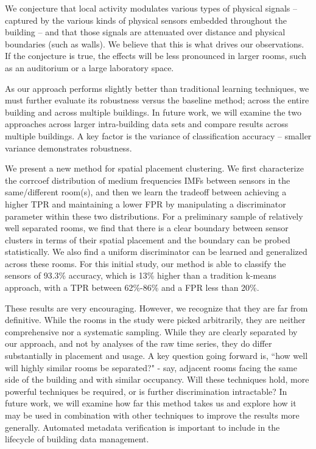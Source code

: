 We conjecture that local activity modulates various types of physical 
signals -- captured by the various kinds of physical sensors embedded
throughout the building -- and that those signals are attenuated
over distance and physical boundaries (such as walls).  We believe that this is what drives our observations. 
If the conjecture is true, the effects will be less pronounced in larger rooms, such as an auditorium or a large laboratory space.


As our approach performs slightly better than traditional learning techniques, we must further evaluate its robustness
versus the baseline method; across the entire building and across multiple buildings.  In future work, we will examine the 
two approaches across larger intra-building data sets and compare results across multiple buildings.
A key factor is the variance of classification accuracy -- smaller variance demonstrates robustness.  

We present a new method for spatial placement clustering.  
We first characterize the corrcoef distribution of medium frequencies IMFs between sensors in the same/different room(s), and then we learn the tradeoff between achieving a higher TPR and maintaining a lower FPR by manipulating a discriminator parameter within these two distributions. 
For a preliminary sample of relatively well separated rooms, we find that there is a clear boundary between sensor clusters in terms of their spatial placement and the boundary can be probed statistically.  We also find 
a uniform discriminator can be learned and generalized across these rooms.  
For this initial study, our method is able to classify the sensors of 93.3\% accuracy, which is 13\% higher than a tradition k-means approach, with a TPR between 62\%-86\% and a FPR less than 20\%. 

These results are very encouraging. However, we recognize that they are far from definitive. While the rooms in the study were picked arbitrarily, they are neither comprehensive nor a systematic sampling.  While they are clearly separated by our approach, and not by analyses of the raw time series, they do differ substantially in placement and usage.  A key question going forward is, ``how well will highly similar rooms be separated?"  - say, adjacent rooms facing the same side of the building and with similar occupancy. Will these techniques hold, more powerful techniques be required, or is further discrimination intractable? In future work, we will examine how far this method takes us and explore how it may be used in combination with other techniques to improve the results more generally. Automated metadata verification is important to include in the lifecycle of building data management.


